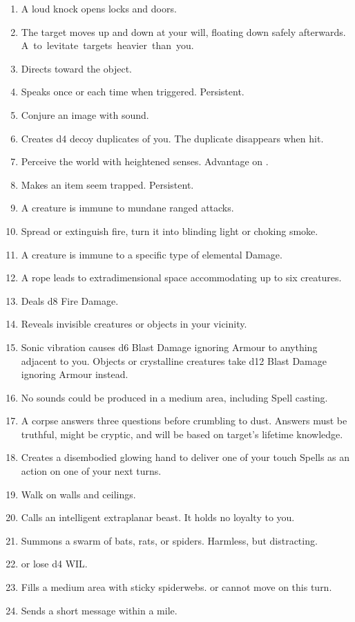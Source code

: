 \documentclass[itdr]{subfiles}
\begin{document}
\begin{enumerate}
	\item {} A loud knock opens locks and doors.
	\item {} The target moves up and down at your will, floating down safely afterwards. \mbox{A  to levitate targets heavier than you.}
	\item {} Directs toward the object.
	\item {} Speaks once or each time when triggered. Persistent.
	\item {} Conjure an image with sound.
	\item {} Creates d4 decoy duplicates of you. The duplicate disappears when hit.
	\item {} Perceive the world with heightened senses. Advantage on .
	\item {} Makes an item seem trapped. Persistent.
	\item {} A creature is immune to mundane ranged attacks.
	\item {} Spread or extinguish fire, turn it into blinding light or choking smoke.
	\item {} A creature is immune to a specific type of elemental Damage.
	\item {} A rope leads to extradimensional space accommodating up to six creatures.
	\item {} Deals d8 Fire Damage.
	\item {} Reveals invisible creatures or objects in your vicinity.
	\item {} Sonic vibration causes d6 Blast Damage ignoring Armour to anything adjacent to you. Objects or crystalline creatures take d12 Blast Damage ignoring Armour instead.
	\item {} No sounds could be produced in a medium area, including Spell casting.
	\item {} A corpse answers three questions before crumbling to dust. Answers must be truthful, might be cryptic, and will be based on target's lifetime knowledge.
	\item {} Creates a disembodied glowing hand to deliver one of your touch Spells as an action on one of your next turns.
	\item {} Walk on walls and ceilings.
	\item {} Calls an intelligent extraplanar beast. It holds no loyalty to you.
	\item {} Summons a swarm of bats, rats, or spiders. Harmless, but distracting.
	\item {}  or lose d4 WIL.
	\item {} Fills a medium area with sticky spiderwebs.  or cannot move on this turn.
	\item {} Sends a short message within a mile.
\end{enumerate}
\end{document}
